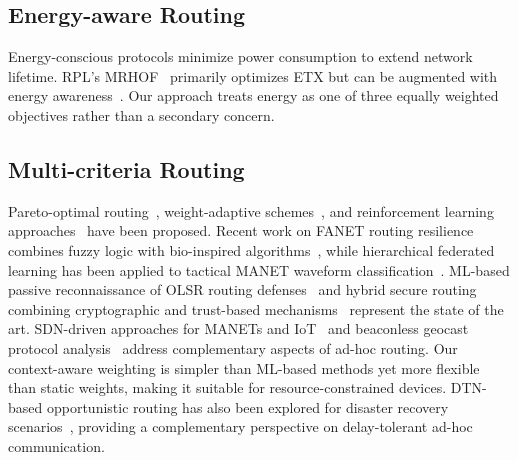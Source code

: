 \documentclass[conference]{IEEEtran}
\begin{document}
\subsection{Energy-aware Routing}
Energy-conscious protocols minimize power consumption to extend network lifetime. RPL's MRHOF~\cite{winter2012rpl} primarily optimizes ETX but can be augmented with energy awareness~\cite{singh1998power,he2014energy,younis2004heed}. Our approach treats energy as one of three equally weighted objectives rather than a secondary concern.

\subsection{Multi-criteria Routing}
Pareto-optimal routing~\cite{farkas2007robustness}, weight-adaptive schemes~\cite{desai2002routing,rahman2007context}, and reinforcement learning approaches~\cite{younis2004heed} have been proposed. Recent work on FANET routing resilience combines fuzzy logic with bio-inspired algorithms~\cite{yuan2026fuzzy}, while hierarchical federated learning has been applied to tactical MANET waveform classification~\cite{thornton2026federated}. ML-based passive reconnaissance of OLSR routing defenses~\cite{schweitzer2026passive} and hybrid secure routing combining cryptographic and trust-based mechanisms~\cite{boufaida2026hybrid} represent the state of the art. SDN-driven approaches for MANETs and IoT~\cite{piroddi2026sdn} and beaconless geocast protocol analysis~\cite{gudmundsson2025beaconless} address complementary aspects of ad-hoc routing. Our context-aware weighting is simpler than ML-based methods yet more flexible than static weights, making it suitable for resource-constrained devices. DTN-based opportunistic routing has also been explored for disaster recovery scenarios~\cite{hasan2025dtn}, providing a complementary perspective on delay-tolerant ad-hoc communication.
\end{document}
